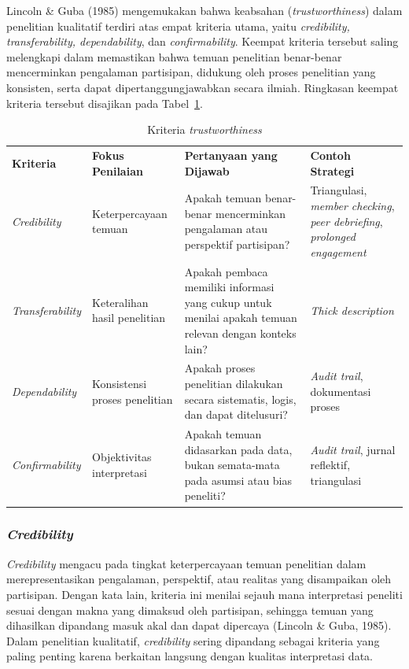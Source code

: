 \documentclass[
  indonesian,
  letterpaper,
  DIV=11,
  numbers=noendperiod]{scrreprt}
\begin{document}
Lincoln \& Guba (1985) mengemukakan bahwa keabsahan
(\emph{trustworthiness}) dalam penelitian kualitatif terdiri atas empat
kriteria utama, yaitu \emph{credibility, transferability,
dependability}, dan \emph{confirmability}. Keempat kriteria tersebut
saling melengkapi dalam memastikan bahwa temuan penelitian benar-benar
mencerminkan pengalaman partisipan, didukung oleh proses penelitian yang
konsisten, serta dapat dipertanggungjawabkan secara ilmiah. Ringkasan
keempat kriteria tersebut disajikan pada
Tabel~\ref{tbl-trustworthiness}.

\begin{longtable}[]{@{}
  >{\raggedright\arraybackslash}p{}
  >{\raggedright\arraybackslash}p{}
  >{\raggedright\arraybackslash}p{}
  >{\raggedright\arraybackslash}p{}@{}}
\caption{Kriteria
\emph{trustworthiness}}\label{tbl-trustworthiness}\tabularnewline
\toprule\noalign{}
\endfirsthead
\endhead
\bottomrule\noalign{}
\endlastfoot
\textbf{Kriteria} & \textbf{Fokus Penilaian} & \textbf{Pertanyaan yang
Dijawab} & \textbf{Contoh Strategi} \\
\emph{Credibility} & Keterpercayaan temuan & Apakah temuan benar-benar
mencerminkan pengalaman atau perspektif partisipan? & Triangulasi,
\emph{member checking}, \emph{peer debriefing}, \emph{prolonged
engagement} \\
\emph{Transferability} & Keteralihan hasil penelitian & Apakah pembaca
memiliki informasi yang cukup untuk menilai apakah temuan relevan dengan
konteks lain? & \emph{Thick description} \\
\emph{Dependability} & Konsistensi proses penelitian & Apakah proses
penelitian dilakukan secara sistematis, logis, dan dapat ditelusuri? &
\emph{Audit trail}, dokumentasi proses \\
\emph{Confirmability} & Objektivitas interpretasi & Apakah temuan
didasarkan pada data, bukan semata-mata pada asumsi atau bias peneliti?
& \emph{Audit trail}, jurnal reflektif, triangulasi \\
\end{longtable}

\subsubsection{\texorpdfstring{\emph{Credibility}}{Credibility}}\label{credibility}

\emph{Credibility} mengacu pada tingkat keterpercayaan temuan penelitian
dalam merepresentasikan pengalaman, perspektif, atau realitas yang
disampaikan oleh partisipan. Dengan kata lain, kriteria ini menilai
sejauh mana interpretasi peneliti sesuai dengan makna yang dimaksud oleh
partisipan, sehingga temuan yang dihasilkan dipandang masuk akal dan
dapat dipercaya (Lincoln \& Guba, 1985). Dalam penelitian kualitatif,
\emph{credibility} sering dipandang sebagai kriteria yang paling penting
karena berkaitan langsung dengan kualitas interpretasi data.
\end{document}
